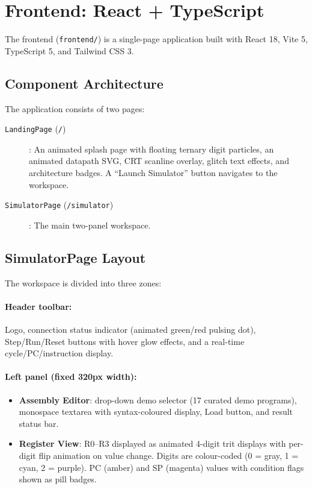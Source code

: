 \documentclass[10pt,a4paper,twoside]{book}
\begin{document}
\section{Frontend: React + TypeScript}

The frontend (\texttt{frontend/}) is a single-page application built with
React 18, Vite 5, TypeScript 5, and Tailwind CSS 3.

\subsection{Component Architecture}

The application consists of two pages:
\begin{description}
    \item[\texttt{LandingPage} (\texttt{/})]: An animated splash page with
          floating ternary digit particles, an animated datapath SVG,
          CRT scanline overlay, glitch text effects, and architecture
          badges. A ``Launch Simulator'' button navigates to the
          workspace.
    \item[\texttt{SimulatorPage} (\texttt{/simulator})]: The main
          two-panel workspace.
\end{description}

\subsection{SimulatorPage Layout}

The workspace is divided into three zones:

\paragraph{Header toolbar:} Logo, connection status indicator (animated
green/red pulsing dot), Step/Run/Reset buttons with hover glow effects,
and a real-time cycle/PC/instruction display.

\paragraph{Left panel (fixed 320px width):}
\begin{itemize}
    \item \textbf{Assembly Editor}: drop-down demo selector (17 curated
          demo programs), monospace textarea with syntax-coloured
          display, Load button, and result status bar.
    \item \textbf{Register View}: R0--R3 displayed as animated 4-digit
          trit displays with per-digit flip animation on value change.
          Digits are colour-coded (0 = gray, 1 = cyan, 2 = purple).
          PC (amber) and SP (magenta) values with condition flags shown
          as pill badges.
\end{itemize}
\end{document}

